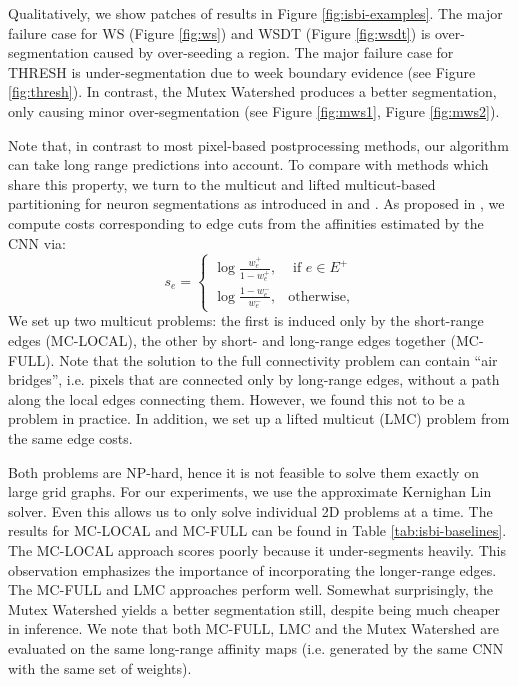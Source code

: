 Qualitatively, we show patches of results in Figure \ref{fig:isbi-examples}.
The major failure case for WS (Figure \ref{fig:ws}) and WSDT (Figure \ref{fig:wsdt})
is over-segmentation caused by over-seeding a region.
The major failure case for THRESH is under-segmentation due to week boundary evidence (see Figure \ref{fig:thresh}).
In contrast, the Mutex Watershed produces a better segmentation, only causing minor over-segmentation (see Figure \ref{fig:mws1}, Figure \ref{fig:mws2}).

Note that, in contrast to most pixel-based postprocessing methods, our algorithm can take long
range predictions into account. To compare with methods which share this property, we turn to the multicut and lifted multicut-based partitioning for neuron segmentations as
introduced in \cite{andres_12_globally} and \cite{horvnakova2017analysis}. As proposed in \cite{andres2012globally}, we compute costs corresponding to edge cuts from the affinities estimated by the CNN via:
\begin{equation}
\label{mc_costs}
    s_e = \begin{cases}
        \log \frac{w^+_e}{1 - w^+_e} , &\text{ if } e \in E^+ \\
        \log \frac{1 - w^-_e}{w^-_e}, & \text{otherwise},
    \end{cases}
\end{equation}
We set up two multicut problems: the first is induced only by the short-range edges (MC-LOCAL), the other by short- and long-range edges together (MC-FULL). Note that the solution to the full connectivity problem can contain ``air bridges'', i.e. 
pixels that are connected only by long-range edges, without a path along the local edges connecting them.
However, we found this not to be a problem in practice.
In addition, we set up a lifted multicut (LMC) problem from the same edge costs.

Both problems are NP-hard, hence it is not feasible to solve them exactly on
large grid graphs. For our experiments, we use the approximate Kernighan Lin \cite{kernighan1970efficient,keuper2015efficient} solver.
Even this allows us to only solve individual 2D problems at a time.
The results for MC-LOCAL and MC-FULL can be found in Table \ref{tab:isbi-baselines}.
The MC-LOCAL approach scores poorly because it under-segments heavily.
This observation emphasizes the importance of incorporating the longer-range edges.
The MC-FULL and LMC approaches perform well. Somewhat surprisingly, the Mutex Watershed yields a better segmentation still,
despite being much cheaper in inference. We note that both MC-FULL, LMC and the Mutex Watershed are evaluated on the same long-range affinity maps (i.e. generated by the same CNN with the same set of weights). 

